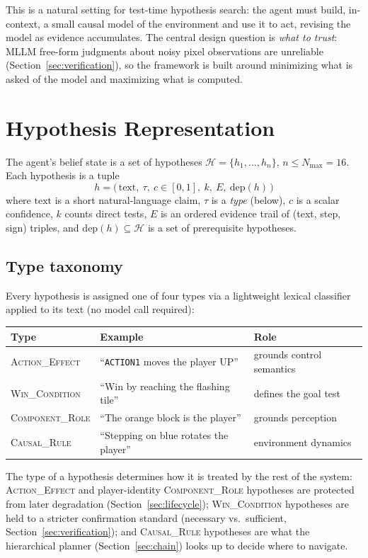 \documentclass{article}
\newcommand{\Hyp}{\mathcal{H}}
\newcommand{\Dep}{\mathrm{dep}}
\begin{document}
This is a natural setting for test-time hypothesis search: the agent
must build, in-context, a small causal model of the environment and use
it to act, revising the model as evidence accumulates. The central
design question is \emph{what to trust}: MLLM free-form judgments about
noisy pixel observations are unreliable (Section~\ref{sec:verification}),
so the framework is built around minimizing what is asked of the model
and maximizing what is computed.

\section{Hypothesis Representation}
\label{sec:representation}

The agent's belief state is a set of hypotheses
$\Hyp = \{h_1, \dots, h_n\}$, $n \le N_{\max}=16$. Each hypothesis is a
tuple
\[
h = \big(\,\mathrm{text},\ \tau,\ c \in [0,1],\ k,\ E,\ \Dep(h)\,\big)
\]
where $\mathrm{text}$ is a short natural-language claim, $\tau$ is a
\emph{type} (below), $c$ is a scalar confidence, $k$ counts direct
tests, $E$ is an ordered evidence trail of (text, step, sign) triples,
and $\Dep(h) \subseteq \Hyp$ is a set of prerequisite hypotheses.

\subsection{Type taxonomy}
Every hypothesis is assigned one of four types via a lightweight
lexical classifier applied to its text (no model call required):

\begin{center}
\begin{tabular}{@{}lll@{}}
\toprule
Type & Example & Role \\
\midrule
\textsc{Action\_Effect} & ``\texttt{ACTION1} moves the player UP'' & grounds control semantics \\
\textsc{Win\_Condition} & ``Win by reaching the flashing tile'' & defines the goal test \\
\textsc{Component\_Role} & ``The orange block is the player'' & grounds perception \\
\textsc{Causal\_Rule} & ``Stepping on blue rotates the player'' & environment dynamics \\
\bottomrule
\end{tabular}
\end{center}

The type of a hypothesis determines how it is treated by the rest of
the system: \textsc{Action\_Effect} and player-identity
\textsc{Component\_Role} hypotheses are protected from later
degradation (Section~\ref{sec:lifecycle}); \textsc{Win\_Condition}
hypotheses are held to a stricter confirmation standard (necessary vs.\
sufficient, Section~\ref{sec:verification}); and \textsc{Causal\_Rule}
hypotheses are what the hierarchical planner (Section~\ref{sec:chain})
looks up to decide where to navigate.
\end{document}
